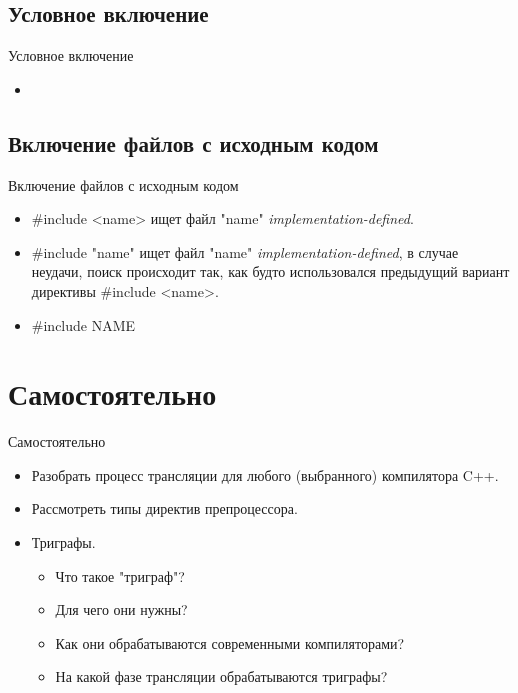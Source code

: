     \subsection{Условное включение}
    \begin{frame}{Условное включение}
        \begin{itemize}
            \item
        \end{itemize}
    \end{frame}
    \subsection{Включение файлов с исходным кодом}
    \begin{frame}{Включение файлов с исходным кодом}
        \begin{itemize}
            \item \#include <name> ищет файл "name" \textit{implementation-defined}.
            \item \#include "name" ищет файл "name" \textit{implementation-defined}, в случае неудачи,
                поиск происходит так, как будто использовался предыдущий вариант директивы \#{include} <name>.
            \item \#{include} NAME
        \end{itemize}
    \end{frame}
    \section{Самостоятельно}
    \begin{frame}{Самостоятельно}
        \begin{itemize}
            \item Разобрать процесс трансляции для любого (выбранного) компилятора C++.
            \item Рассмотреть типы директив препроцессора.
            \item Триграфы.
                \begin{itemize}
                    \item Что такое "триграф"?
                    \item Для чего они нужны?
                    \item Как они обрабатываются современными компиляторами?
                    \item На какой фазе трансляции обрабатываются триграфы?
                \end{itemize}
        \end{itemize}
    \end{frame}
